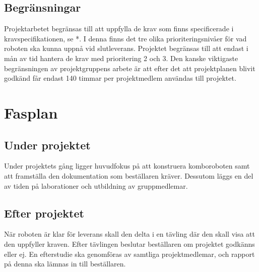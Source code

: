\documentclass[a4paper,12pt]{article}
\begin{document}
\subsection{Begränsningar}
Projektarbetet begränsas till att uppfylla de krav som finns specificerade i kravspecifikationen, se *. I denna finns det tre olika prioriteringsnivåer för vad roboten ska kunna uppnå vid slutleverans. Projektet begränsas till att endast i mån av tid hantera de krav med prioritering 2 och 3.
Den kanske viktigaste begränsningen av projektgruppens arbete är att efter det att projektplanen blivit godkänd får endast 140 timmar per projektmedlem användas till projektet.

\section{Fasplan}		
\subsection{Under projektet}
Under projektets gång ligger huvudfokus på att konstruera komboroboten samt att framställa den dokumentation som beställaren kräver. Dessutom läggs en del av tiden på laborationer och utbildning av gruppmedlemar.
\subsection{Efter projektet}
När roboten är klar för leverans skall den delta i en tävling där den skall visa att den uppfyller kraven. Efter tävlingen beslutar beställaren om projektet godkänns eller ej. En efterstudie ska genomföras av samtliga projektmedlemar, och rapport på denna ska lämnas in till beställaren. 
\end{document}
